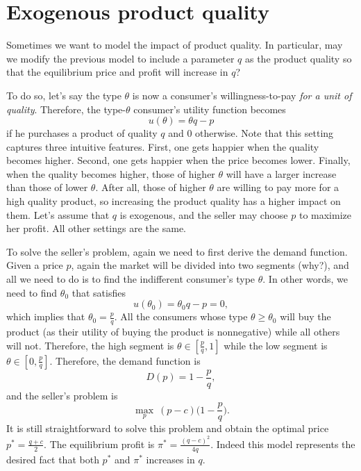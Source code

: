 \documentclass[12pt,a4paper]{article}
\begin{document}
\section{Exogenous product quality}

Sometimes we want to model the impact of product quality. 
In particular, may we modify the previous model to include a parameter
$q$ as the product quality so that the equilibrium price and profit will
increase in $q$? 

To do so, let's say the type $\theta$ is now a consumer's willingness-to-pay
\textit{for a unit of quality}. Therefore, the type-$\theta$ consumer's 
utility function becomes
\[
	u(\theta) = \theta q - p
\]
if he purchases a product of quality $q$ and 0 otherwise. 
Note that this setting captures 
three intuitive features. First, one gets happier when the quality becomes higher. 
Second, one gets happier when the price becomes lower. 
Finally, when the quality becomes higher, those of higher $\theta$ 
will have a larger increase than those of lower $\theta$. After all, 
those of higher $\theta$ are willing to pay more for a high quality product, 
so increasing the product quality has a higher impact on them. 
Let's assume that $q$ is exogenous, and the seller may choose $p$ to maximize
her profit. All other settings are the same. 

To solve the seller's problem, again we need to first derive the demand function. 
Given a price $p$, again the market will be divided into two segments (why?), 
and all we need to do is to find the indifferent consumer's type $\theta$. 
In other words, we need to find $\theta_0$ that satisfies
\[
	u(\theta_0) = \theta_0 q - p = 0, 
\]
which implies that $\theta_0 = \frac{p}{q}$. All the consumers whose type 
$\theta \geq \theta_0$ will buy the product (as their utility of buying 
the product is nonnegative) while all others will not. Therefore, 
the high segment is $\theta \in [\frac{p}{q}, 1]$ while the low segment
is $\theta \in [0, \frac{p}{q}]$. 
Therefore, the demand function is 
\[
	D(p) = 1 - \frac{p}{q}, 
\]
and the seller's problem is 
\[
	\max_p \ (p - c)\bigg(1 - \frac{p}{q}\bigg). 
\]
It is still straightforward to solve this problem and obtain the optimal price 
$p^* = \frac{q + c}{2}$. The equilibrium profit is $\pi^* = \frac{(q - c)^2}{4q}$. 
Indeed this model represents the desired fact that both $p^*$ and $\pi^*$ increases
in $q$. 
\end{document}
